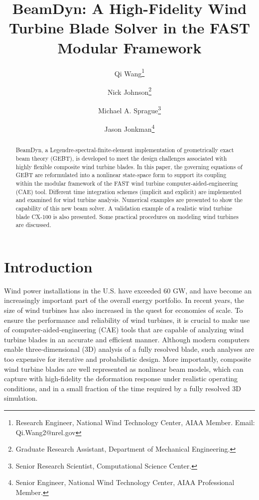 \documentclass{aiaa-tc}
\title{BeamDyn: A High-Fidelity Wind Turbine Blade Solver in the FAST
Modular Framework}
\author[1]{Qi Wang\thanks{Research Engineer, National Wind Technology Center, AIAA Member. Email: Qi.Wang2@nrel.gov}}
\author[2]{Nick Johnson\thanks{Graduate Research Assistant, Department of
Mechanical Engineering.}}
\author[1]{Michael A. Sprague\thanks{Senior Research Scientist, 
Computational Science Center.}}
\author[1]{Jason Jonkman\thanks{Senior Engineer, National Wind Technology Center, AIAA Professional Member.}}
\affil[1]{National Renewable Energy Laboratory, Golden, CO 80401}
\affil[2]{Colorado School of Mines, Golden, CO 80401}
\begin{document}
\maketitle

\begin{abstract}
{BeamDyn, a Legendre-spectral-finite-element implementation of geometrically
exact beam theory (GEBT), is developed to meet the design challenges
associated with highly flexible composite wind turbine blades. In this
paper, the governing equations of GEBT are reformulated into a nonlinear
state-space form to support its coupling within the
modular framework of the FAST wind turbine
computer-aided-engineering (CAE) tool. Different time integration
schemes (implicit and explicit) are implemented and examined for wind
turbine analysis.  Numerical examples are presented to show the capability of this new beam solver. A validation example of a realistic wind turbine blade CX-100 is also presented. Some practical procedures on modeling wind turbines are discussed.}     
\end{abstract}

\section{Introduction} Wind power installations in the U.S. have exceeded 60
GW, and have become an increasingly important part of the overall energy
portfolio. In recent years, the size of wind turbines has also increased in
the quest for economies of scale.   To ensure the performance and
reliability of wind turbines, it is crucial to make use of
computer-aided-engineering (CAE) tools that are capable of analyzing wind
turbine blades in an accurate and efficient manner. Although modern
computers enable three-dimensional (3D) analysis
of a fully resolved blade, such analyses are too
expensive for iterative and probabilistic design. More importantly, composite wind
turbine blades are well represented as nonlinear beam models, which can
capture with high-fidelity the deformation response under realistic
operating conditions, and in a small fraction of the time required by a
fully resolved 3D simulation. 
\end{document}

